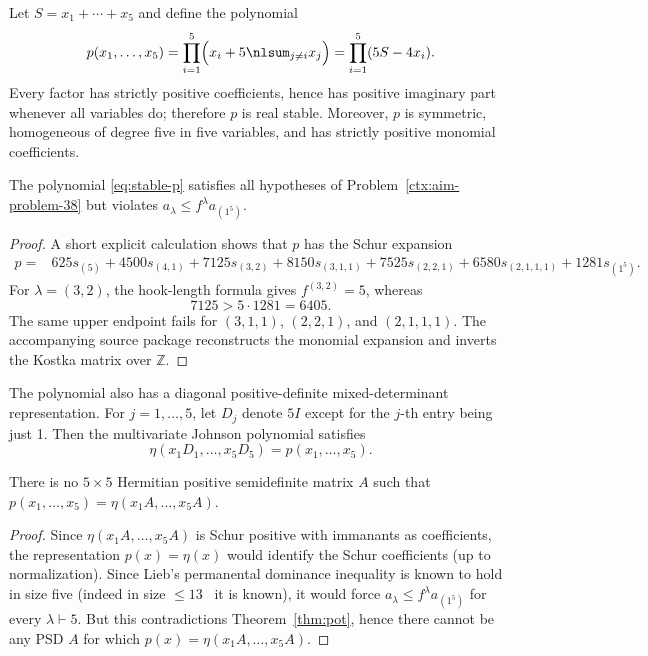 \begin{cxrefutation}
Let $S=x_1+\cdots+x_5$ and define the polynomial
\begin{equation}\label{eq:stable-p}
p(x_1,\ldots,x_5)=\prod_{i=1}^5\Bigl(x_i+5\nlsum_{j\ne i}x_j\Bigr)=\prod_{i=1}^5(5S-4x_i).
\end{equation}
Every factor has strictly positive coefficients, hence has positive imaginary part whenever all variables do; therefore $p$ is real stable. Moreover, $p$ is symmetric, homogeneous of degree five in five variables, and has strictly positive monomial coefficients. %

\begin{theorem}\label{thm:pot}
The polynomial \eqref{eq:stable-p} satisfies all hypotheses of Problem~\ref{ctx:aim-problem-38} but violates $a_\lambda\le f^\lambda a_{(1^5)}$.
\end{theorem}
\begin{proof}
A short explicit calculation shows that $p$ has the Schur expansion
\begin{align*}
p={}&625s_{(5)}+4500s_{(4,1)}+7125s_{(3,2)}+8150s_{(3,1,1)}+7525s_{(2,2,1)}+6580s_{(2,1,1,1)}+1281s_{(1^5)}.
\end{align*}
For $\lambda=(3,2)$, the hook-length formula gives $f^{(3,2)}=5$, whereas
\[
7125>5\cdot1281=6405.
\]
The same upper endpoint fails for $(3,1,1)$, $(2,2,1)$, and $(2,1,1,1)$.  The accompanying source package reconstructs the monomial expansion and inverts the Kostka matrix over $\mathbb Z$.
\end{proof}

The polynomial also has a diagonal positive-definite mixed-determinant representation.  For $j=1,\ldots,5$, let $D_j$ denote $5I$ except for the $j$-th entry being just 1. 
Then the multivariate Johnson polynomial satisfies
\[
\eta(x_1D_1,\ldots,x_5D_5)=p(x_1,\ldots,x_5).
\]

\begin{theorem}\label{thm:common-A}
There is no $5\times5$ Hermitian positive semidefinite matrix $A$ such that $p(x_1,\ldots,x_5)=\eta(x_1A,\ldots,x_5A)$.
\end{theorem}
\begin{proof}
Since $\eta(x_1A,\ldots,x_5A)$ is Schur positive with immanants as coefficients, the representation $p(x)=\eta(x)$ would identify the Schur coefficients (up to normalization). Since Lieb's permanental dominance inequality is known to hold in size five (indeed in size $\le 13$~\cite{Wanless2022} it is known), it would force
$a_\lambda\le f^\lambda a_{(1^5)}$ for every $\lambda\vdash5$. But this contradictions Theorem~\ref{thm:pot}, hence there cannot be any PSD $A$ for which $p(x)=\eta(x_1A,\ldots,x_5A)$.
\end{proof}


\end{cxrefutation}
